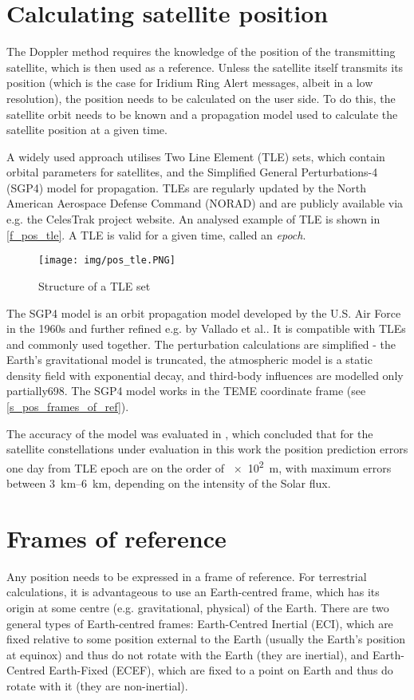 \section{Calculating satellite position}
\label{s_pos_tle_sgp4} 
The Doppler method requires the knowledge of the position of the transmitting satellite, which is then used as a reference. Unless the satellite itself transmits its position (which is the case for Iridium Ring Alert messages, albeit in a low resolution), the position needs to be calculated on the user side. To do this, the satellite orbit needs to be known and a propagation model used to calculate the satellite position at a given time.

A widely used approach utilises Two Line Element (TLE) sets, which contain orbital parameters for satellites, and the Simplified General Perturbations-4 (SGP4) model for propagation. TLEs are regularly updated by the North American Aerospace Defense Command (NORAD) and are publicly available via e.g. the CelesTrak project website\cite{des11}. An analysed example of TLE is shown in \autoref{f_pos_tle}. A TLE is valid for a given time, called an \textit{epoch}.

\begin{figure}
    \centering
    \texttt{[image: img/pos\_tle.PNG]}
    \caption{Structure of a TLE set\cite{pos06}}
    \label{f_pos_tle}
\end{figure}

The SGP4 model is an orbit propagation model developed by the U.S. Air Force in the 1960s and further refined e.g. by Vallado et al.\cite{des06}. It is compatible with TLEs and commonly used together. The perturbation calculations are simplified - the Earth’s gravitational model is truncated, the atmospheric model is a static density field with exponential decay, and third-body influences are modelled only partially\citep{pos01}{698}. The SGP4 model works in the TEME coordinate frame (see \autoref{s_pos_frames_of_ref}).

The accuracy of the model was evaluated in \cite{pos07}, which concluded that for the satellite constellations under evaluation in this work the position prediction errors one day from TLE epoch are on the order of \qty{e2}{m}, with maximum errors between \qtyrange{3}{6}{km}, depending on the intensity of the Solar flux.



\section{Frames of reference}
\label{s_pos_frames_of_ref}
Any position needs to be expressed in a frame of reference. For terrestrial calculations, it is advantageous to use an Earth-centred frame, which has its origin at some centre (e.g. gravitational, physical) of the Earth. There are two general types of Earth-centred frames: Earth-Centred Inertial (ECI), which are fixed relative to some position external to the Earth (usually the Earth's position at equinox) and thus do not rotate with the Earth (they are inertial), and Earth-Centred Earth-Fixed (ECEF), which are fixed to a point on Earth and thus do rotate with it (they are non-inertial).

